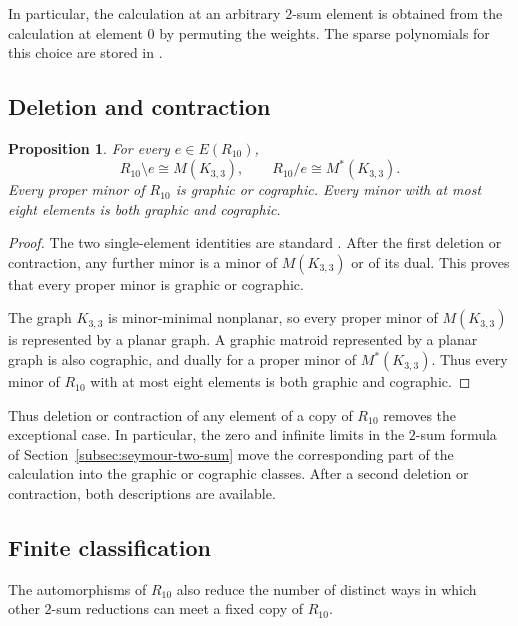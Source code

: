 \documentclass[11pt]{article}
\numberwithin{equation}{section}
\newtheorem{proposition}[definition]{Proposition}
\theoremstyle{remark}
\begin{document}
In particular, the calculation at an arbitrary $2$-sum element is obtained
from the calculation at element $0$ by permuting the weights.  The sparse
polynomials for this choice are stored in
.

\subsection{Deletion and contraction}
\label{subsec:r10-proper-minors}

\begin{proposition}
\label{prop:r10-proper-minors}
For every $e\in E(R_{10})$,
\begin{equation}
    R_{10}\setminus e\cong M(K_{3,3}),
    \qquad
    R_{10}/e\cong M^*(K_{3,3}).
    \label{eq:r10-single-element-minors}
\end{equation}
Every proper minor of $R_{10}$ is graphic or cographic.  Every minor with at
most eight elements is both graphic and cographic.
\end{proposition}

\begin{proof}
The two single-element identities are standard
\cite[Lem.~6.6.9]{Oxley2011}. After the first deletion or contraction, any
further minor is a minor of $M(K_{3,3})$ or of its dual. This proves
that every proper minor is graphic or cographic.

The graph $K_{3,3}$ is minor-minimal nonplanar, so every proper minor of
$M(K_{3,3})$ is represented by a planar graph. A graphic matroid represented
by a planar graph is also cographic, and dually for a proper minor of
$M^*(K_{3,3})$. Thus every minor of $R_{10}$ with at most eight elements is
both graphic and cographic.
\end{proof}

Thus deletion or contraction of any element of a copy of $R_{10}$ removes
the exceptional case. In particular, the zero and infinite limits in the
$2$-sum formula of Section~\ref{subsec:seymour-two-sum} move the corresponding
part of the calculation into the graphic or cographic classes. After a
second deletion or contraction, both descriptions are available.

\subsection{Finite classification}
\label{subsec:r10-finite-classification}

The automorphisms of $R_{10}$ also reduce the number of distinct ways in
which other $2$-sum reductions can meet a fixed copy of $R_{10}$.
\end{document}

